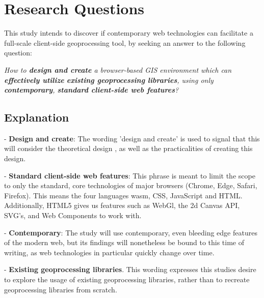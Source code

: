 


\newpage
\section{Research Questions}


This study intends to discover if contemporary web technologies can facilitate a full-scale client-side geoprocessing tool, by seeking an answer to the following question: 

\textit{How to \textbf{design and create} a browser-based GIS environment which can \textbf{effectively utilize} \textbf{existing geoprocessing libraries}, using only \textbf{contemporary}, \textbf{standard client-side web features}?}

\subsection*{Explanation}


- \textbf{Design and create}: The wording 'design and create' is used to signal that this will consider the theoretical design , as well as the practicalities of creating this design. 

- \textbf{Standard client-side web features}: This phrase is meant to limit the scope to only the standard, core technologies of major browsers (Chrome, Edge, Safari, Firefox). This means the four languages \ac{wasm}, CSS, JavaScript and HTML. Additionally, HTML5 gives us features such as WebGl, the 2d Canvas API, SVG's, and Web Components to work with.

- \textbf{Contemporary}: The study will use contemporary, even bleeding edge features of the modern web, but its findings will nonetheless be bound to this time of writing, as web technologies in particular quickly change over time. 

- \textbf{Existing geoprocessing libraries}. This wording expresses this studies desire to explore the usage of existing geoprocessing libraries, rather than to recreate geoprocessing libraries from scratch.

